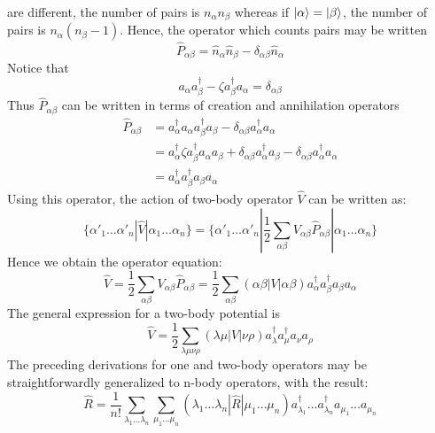 \documentclass[12pt]{article}
\begin{document}
are different, the number of pairs is $n_\alpha n_\beta$ whereas 
if $\ket{\alpha}=\ket{\beta}$, the number of pairs is $n_\alpha (n_\beta-1)$. 
Hence, the operator which counts pairs may be written
\begin{equation*}
    \hat{P}_{\alpha\beta}=\hat{n}_\alpha\hat{n}_\beta-\delta_{\alpha\beta}\hat{n}_\alpha
\end{equation*}
Notice that
\begin{equation*}
    a_\alpha a^\dagger_\beta-\zeta a^\dagger_\beta a_\alpha=\delta_{\alpha\beta}
\end{equation*}
Thus $\hat{P}_{\alpha\beta}$ can be written in terms of creation and annihilation 
operators
\begin{equation*}
    \begin{split}
        \hat{P}_{\alpha\beta}&=a^\dagger_\alpha a_\alpha a^\dagger_\beta a_\beta-
        \delta_{\alpha\beta}a^\dagger_\alpha a_\alpha\\
        &=a^\dagger_\alpha\zeta a^\dagger_\beta a_\alpha a_\beta
        +\delta_{\alpha\beta}a^\dagger_\alpha a_\beta
        -\delta_{\alpha\beta}a^\dagger_\alpha a_\alpha\\
        &=a^\dagger_\alpha a^\dagger_\beta a_\beta a_\alpha
    \end{split}
\end{equation*}
Using this operator, the action of two-body operator $\hat{V}$ can be written as:
\begin{equation*}
    \{\alpha'_1\dots\alpha'_n|\hat{V}|\alpha_1\dots\alpha_n\}=\{\alpha'_1\dots\alpha'_n|
    \frac{1}{2}\sum_{\alpha\beta}V_{\alpha\beta}\hat{P}_{\alpha\beta}|\alpha_1\dots\alpha_n\}
\end{equation*}
Hence we obtain the operator equation:
\begin{equation*}
    \hat{V}=\frac{1}{2}\sum_{\alpha\beta}V_{\alpha\beta}\hat{P}_{\alpha\beta}
    =\frac{1}{2}\sum_{\alpha\beta}(\alpha\beta|V|\alpha\beta)
    a^\dagger_\alpha a^\dagger_\beta a_\beta a_\alpha
\end{equation*}
The general expression for a two-body potential is
\begin{equation*}
    \hat{V}=\frac{1}{2}\sum_{\lambda\mu\nu\rho}(\lambda\mu|V|\nu\rho)
    a^\dagger_\lambda a^\dagger_\mu a_\nu a_\rho
\end{equation*}
The preceding derivations for one and two-body operators may be straightforwardly 
generalized to n-body operators, with the result:
\begin{equation*}
    \hat{R}=\frac{1}{n!}\sum_{\lambda_1\dots\lambda_n}\sum_{\mu_1\dots\mu_n}
    (\lambda_1\dots\lambda_n|\hat{R}|\mu_1\dots\mu_n)a^\dagger_{\lambda_1}
    \dots a^\dagger_{\lambda_n}a_{\mu_1}\dots a_{\mu_n}
\end{equation*}
\end{document}
